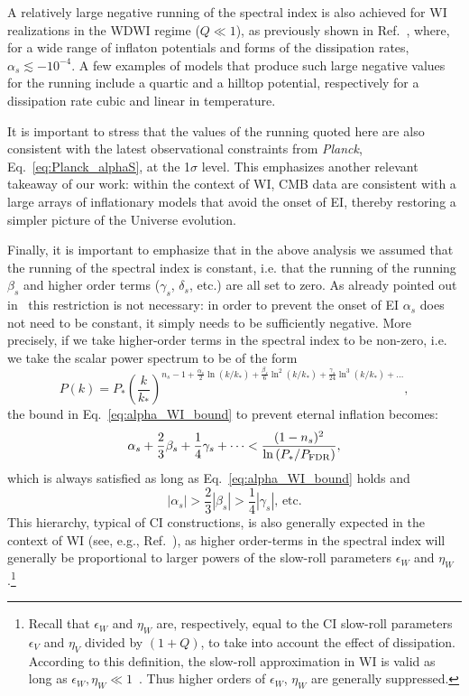 \documentclass[a4paper,11pt]{article}
\begin{document}
A relatively large negative running
of the spectral index is also achieved for WI realizations in the WDWI
regime ($Q\ll1$), as previously shown in Ref.~\cite{Benetti:2016jhf},
where, for a wide range of inflaton potentials  and forms of the
dissipation rates, $\alpha_s\lesssim-10^{-4}$. A few examples of models that produce such large negative values for the running include a quartic and a hilltop potential, respectively for a dissipation rate cubic and linear in temperature.

It is important to
stress that the values of the running quoted here are also consistent
with the latest observational constraints from \textit{Planck},
Eq.~\eqref{eq:Planck_alphaS}, at the 1$\sigma$ level. This emphasizes another relevant takeaway of our work: within the context of WI, CMB data are consistent with a large
arrays of inflationary models that avoid the onset of EI, thereby
restoring a simpler picture of the Universe evolution.

Finally, it is important to emphasize that in the above analysis we assumed that the running of the spectral
index is constant, i.e. that the running of the running $\beta_s$ and
higher order terms ($\gamma_s$, $\delta_s$, etc.) are all set to
zero. As already pointed out in~\cite{Kinney:2014jya} this restriction
is not necessary: in order to prevent the onset of EI $\alpha_s$ does
not need to be constant, it simply needs to be sufficiently
negative. More precisely, if we take higher-order terms in the
spectral index to be non-zero, i.e. we take the scalar power spectrum to be of the form
\begin{equation}
    P(k)=P_*\left(\frac{k}{k_*}\right)^{n_s-1+\frac{\alpha_s}{2}\ln(k/k_*)+\frac{\beta_s}{6}\ln^2(k/k_*)+\frac{\gamma_s}{24}\ln^3(k/k_*)+\dots},
\end{equation}
the bound in
Eq.~\eqref{eq:alpha_WI_bound} to prevent eternal inflation
becomes:
\begin{equation}
\alpha_s+\frac{2}{3}\beta_s+\frac{1}{4}\gamma_s+\cdots <
\frac{(1-n_s)^2}{\ln\left(P_*/P_{\rm{FDR}}\right)},
\end{equation}
%
which is always satisfied as long as Eq.~\eqref{eq:alpha_WI_bound}
holds and
\begin{equation}
    |\alpha_s|>\frac{2}{3}|\beta_s|>\frac{1}{4}|\gamma_s|,\,\text{etc.}
\end{equation}
 This hierarchy, typical of CI constructions, is also generally
expected in the context of WI (see, e.g., Ref.~\cite{Das:2022ubr}), as
higher order-terms in the spectral index will generally be
proportional to larger powers of the slow-roll parameters $\epsilon_W$
and $\eta_W$.\footnote{Recall that $\epsilon_W$ and $\eta_W$ are,
respectively, equal to the CI slow-roll parameters $\epsilon_V$ and
$\eta_V$ divided by $(1+Q)$, to take into account the effect of
dissipation. According to this definition, the slow-roll approximation
in WI is valid as long as   $\epsilon_W,\eta_W \ll
1$~\cite{Berera:2008ar}. Thus higher orders of $\epsilon_W$, $\eta_W$
are generally suppressed.}
\end{document}
